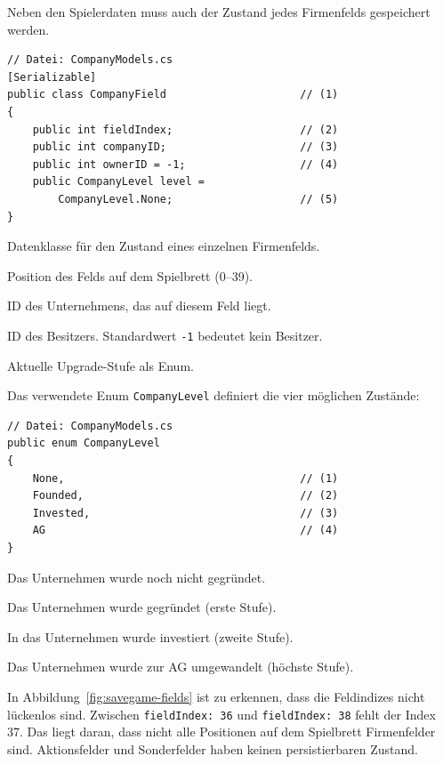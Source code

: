 \documentclass[12pt,a4paper]{article}
\begin{document}
Neben den Spielerdaten muss auch der Zustand jedes Firmenfelds gespeichert werden.

\begin{lstlisting}
// Datei: CompanyModels.cs
[Serializable]
public class CompanyField                     // (1)
{
    public int fieldIndex;                    // (2)
    public int companyID;                     // (3)
    public int ownerID = -1;                  // (4)
    public CompanyLevel level =
        CompanyLevel.None;                    // (5)
}
\end{lstlisting}

\begin{description}[leftmargin=2em, labelwidth=1.5em]
    \item[(1)] Datenklasse für den Zustand eines einzelnen Firmenfelds.
    \item[(2)] Position des Felds auf dem Spielbrett (0--39).
    \item[(3)] ID des Unternehmens, das auf diesem Feld liegt.
    \item[(4)] ID des Besitzers. Standardwert \texttt{-1} bedeutet kein Besitzer.
    \item[(5)] Aktuelle Upgrade-Stufe als Enum.
\end{description}

Das verwendete Enum \texttt{CompanyLevel} definiert die vier möglichen Zustände:

\begin{lstlisting}
// Datei: CompanyModels.cs
public enum CompanyLevel
{
    None,                                     // (1)
    Founded,                                  // (2)
    Invested,                                 // (3)
    AG                                        // (4)
}
\end{lstlisting}

\begin{description}[leftmargin=2em, labelwidth=1.5em]
    \item[(1)] Das Unternehmen wurde noch nicht gegründet.
    \item[(2)] Das Unternehmen wurde gegründet (erste Stufe).
    \item[(3)] In das Unternehmen wurde investiert (zweite Stufe).
    \item[(4)] Das Unternehmen wurde zur AG umgewandelt (höchste Stufe).
\end{description}

In Abbildung~\ref{fig:savegame-fields} ist zu erkennen, dass die Feldindizes nicht lückenlos sind. Zwischen \texttt{fieldIndex: 36} und \texttt{fieldIndex: 38} fehlt der Index 37. Das liegt daran, dass nicht alle Positionen auf dem Spielbrett Firmenfelder sind. Aktionsfelder und Sonderfelder haben keinen persistierbaren Zustand.
\end{document}

